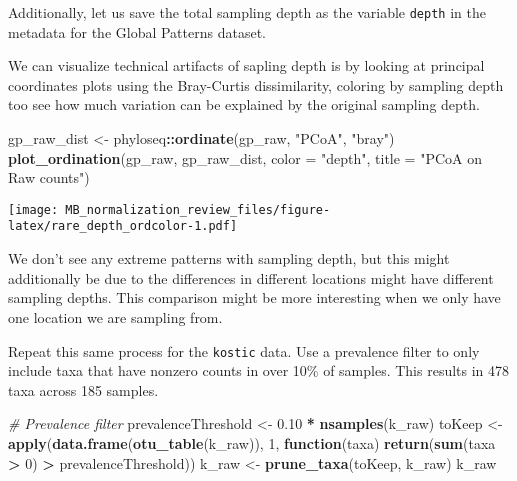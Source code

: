 \documentclass[
]{book}
\newenvironment{Shaded}{\begin{snugshade}}{\end{snugshade}}
\newcommand{\CommentTok}[1]{\textcolor[rgb]{0.56,0.35,0.01}{\textit{#1}}}
\newcommand{\ControlFlowTok}[1]{\textcolor[rgb]{0.13,0.29,0.53}{\textbf{#1}}}
\newcommand{\DataTypeTok}[1]{\textcolor[rgb]{0.13,0.29,0.53}{#1}}
\newcommand{\DecValTok}[1]{\textcolor[rgb]{0.00,0.00,0.81}{#1}}
\newcommand{\FloatTok}[1]{\textcolor[rgb]{0.00,0.00,0.81}{#1}}
\newcommand{\KeywordTok}[1]{\textcolor[rgb]{0.13,0.29,0.53}{\textbf{#1}}}
\newcommand{\NormalTok}[1]{#1}
\newcommand{\OperatorTok}[1]{\textcolor[rgb]{0.81,0.36,0.00}{\textbf{#1}}}
\newcommand{\StringTok}[1]{\textcolor[rgb]{0.31,0.60,0.02}{#1}}
\begin{document}
Additionally, let us save the total sampling depth as the variable \texttt{depth} in the metadata for the Global Patterns dataset.

\begin{Shaded}
\end{Shaded}

We can visualize technical artifacts of sapling depth is by looking at principal coordinates plots using the Bray-Curtis dissimilarity, coloring by sampling depth too see how much variation can be explained by the original sampling depth.

\begin{Shaded}
\begin{Highlighting}[]
\NormalTok{gp\_raw\_dist \textless{}{-}}\StringTok{ }\NormalTok{phyloseq}\OperatorTok{::}\KeywordTok{ordinate}\NormalTok{(gp\_raw, }\StringTok{"PCoA"}\NormalTok{, }\StringTok{"bray"}\NormalTok{)}
\KeywordTok{plot\_ordination}\NormalTok{(gp\_raw,}
\NormalTok{                gp\_raw\_dist,}
                \DataTypeTok{color =} \StringTok{"depth"}\NormalTok{, }
                \DataTypeTok{title =} \StringTok{"PCoA on Raw counts"}\NormalTok{)}
\end{Highlighting}
\end{Shaded}

\texttt{[image: MB\_normalization\_review\_files/figure-latex/rare\_depth\_ordcolor-1.pdf]}

We don't see any extreme patterns with sampling depth, but this might additionally be due to the differences in different locations might have different sampling depths. This comparison might be more interesting when we only have one location we are sampling from.

Repeat this same process for the \texttt{kostic} data. Use a prevalence filter to only include taxa that have nonzero counts in over 10\% of samples. This results in 478 taxa across 185 samples.

\begin{Shaded}
\begin{Highlighting}[]
\CommentTok{\# Prevalence filter}
\NormalTok{prevalenceThreshold \textless{}{-}}\StringTok{ }\FloatTok{0.10} \OperatorTok{*}\StringTok{ }\KeywordTok{nsamples}\NormalTok{(k\_raw)}
\NormalTok{toKeep \textless{}{-}}\StringTok{ }\KeywordTok{apply}\NormalTok{(}\KeywordTok{data.frame}\NormalTok{(}\KeywordTok{otu\_table}\NormalTok{(k\_raw)), }\DecValTok{1}\NormalTok{, }\ControlFlowTok{function}\NormalTok{(taxa)}
    \KeywordTok{return}\NormalTok{(}\KeywordTok{sum}\NormalTok{(taxa }\OperatorTok{\textgreater{}}\StringTok{ }\DecValTok{0}\NormalTok{) }\OperatorTok{\textgreater{}}\StringTok{ }\NormalTok{prevalenceThreshold))}
\NormalTok{k\_raw \textless{}{-}}\StringTok{ }\KeywordTok{prune\_taxa}\NormalTok{(toKeep, k\_raw)}
\NormalTok{k\_raw}
\end{Highlighting}
\end{Shaded}
\end{document}
